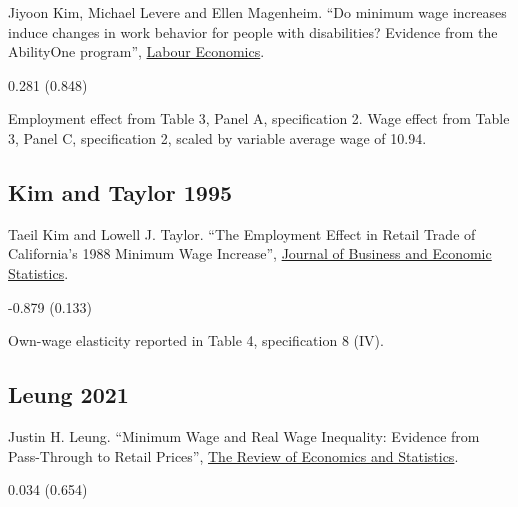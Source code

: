 \noindent Jiyoon Kim, Michael Levere and Ellen Magenheim. ``Do minimum wage increases induce changes in work behavior for people with disabilities? Evidence from the AbilityOne program'', \href{https://doi.org/10.1016/j.labeco.2024.102663}{Labour Economics}.

\vspace{0.7em}

 0.281 (0.848)

\vspace{0.7em}

 Employment effect from Table 3, Panel A, specification 2. Wage effect from Table 3, Panel C, specification 2, scaled by variable average wage of 10.94.

\subsection*{Kim and Taylor 1995}
\vspace{-0.7em}

\noindent Taeil Kim and Lowell J. Taylor. ``The Employment Effect in Retail Trade of California’s 1988 Minimum Wage Increase'', \href{https://doi.org/10.1080/07350015.1995.10524591}{Journal of Business and Economic Statistics}.

\vspace{0.7em}

 -0.879 (0.133)

\vspace{0.7em}

 Own-wage elasticity reported in Table 4, specification 8 (IV).

\subsection*{Leung 2021}
\vspace{-0.7em}

\noindent Justin H. Leung. ``Minimum Wage and Real Wage Inequality: Evidence from Pass-Through to Retail Prices'', \href{https://doi.org/10.1162/rest_a_00915}{The Review of Economics and Statistics}.

\vspace{0.7em}

 0.034 (0.654)

\vspace{0.7em}

